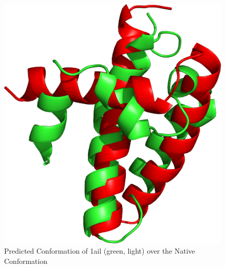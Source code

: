 \begin{figure}[ht]
    \centering
    \includegraphics[width=0.9\linewidth]{Figuras/prots/1ail_render.png}
    \caption{Predicted Conformation of 1ail (green, light) over the Native Conformation}
    \label{fig:1ail-visual}
\end{figure}

